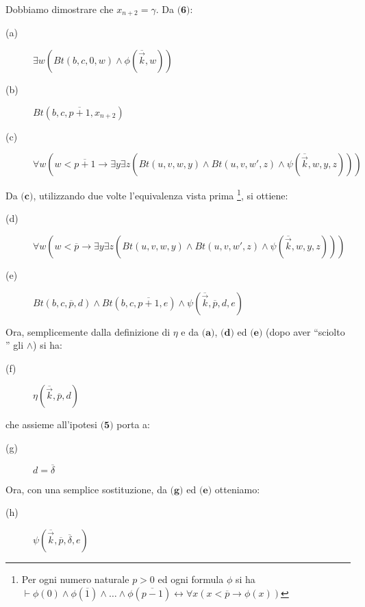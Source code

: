 \begin{itemize}
\begin{enumerate}
        Dobbiamo dimostrare che $x_{n+2}=\gamma$.
        Da $\textbf{(6)}$: \\
        \begin{description}
          \item[(a)] $\exists w(Bt(b,c,0,w)\land \phi(\overline{\vec{k}},w))$
          \item[(b)] $Bt(b,c,\overline{p+1},x_{n+2})$
          \item[(c)] $\forall w(w<\overline{p+1} \to \exists y\exists z(Bt(u,v,w,y)\land Bt(u,v,w',z)\land \psi(\overline{\vec{k}},w,y,z)))$ \\
        \end{description}
        Da $\textbf{(c)}$, utilizzando due volte l'equivalenza vista prima \footnote{Per ogni numero naturale $p>0$ ed ogni formula $\phi$ si ha $\vdash\phi(0)\land \phi(\overline{1})\land\ldots\land \phi(\overline{p-1}) \leftrightarrow \forall x(x<\overline{p} \to \phi(x))$}, si ottiene: \\
        \begin{description}
          \item[(d)] $\forall w(w<\overline{p} \to \exists y\exists z(Bt(u,v,w,y)\land Bt(u,v,w',z)\land \psi(\overline{\vec{k}},w,y,z)))$
          \item[(e)] $Bt(b,c,\overline{p},d) \land Bt(b,c, \overline{p+1},e) \land \psi(\overline{\vec{k}},\overline{p},d,e)$ \\
        \end{description}
        Ora, semplicemente dalla definizione di $\eta$ e da $\textbf{(a)}$, $\textbf{(d)}$ ed $\textbf{(e)}$ (dopo aver ``sciolto '' gli $\land$) si ha: \\
        \begin{description}
          \item [(f)] $\eta(\overline{\vec{k}},\overline{p},d)$ \\
        \end{description}
        che assieme all'ipotesi $\textbf{(5)}$ porta a: \\
        \begin{description}
          \item [(g)] $d=\overline{\delta}$ \\
        \end{description}
        Ora, con una semplice sostituzione, da $\textbf{(g)}$ ed $\textbf{(e)}$ otteniamo: \\
        \begin{description}
          \item [(h)] $\psi(\overline{\vec{k}},\overline{p},\overline{\delta},e)$ \\

\end{description}
\end{enumerate}
\end{itemize}
